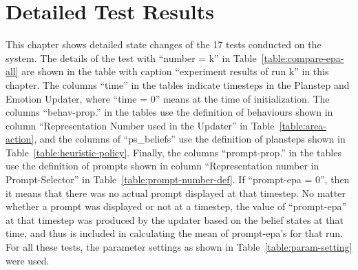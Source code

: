 
\chapter{Detailed Test Results}

This chapter shows detailed state changes of the 17 tests conducted on the system. The details of the test with ``number = k'' in Table~\ref{table:compare-epa-all} are shown in the table with caption ``experiment results of run k'' in this chapter. The columns ``time'' in the tables indicate timesteps in the Planstep and Emotion Updater, where ``time = 0'' means at the time of initialization. The columns ``behav-prop.'' in the tables use the definition of behaviours shown in column ``Representation Number used in the Updater'' in Table~\ref{table:area-action}, and the columns of ``ps\_beliefs'' use the definition of plansteps shown in Table~\ref{table:heuristic-policy}. Finally, the columns ``prompt-prop.'' in the tables use the definition of prompts shown in column ``Representation number in Prompt-Selector'' in Table~\ref{table:prompt-number-def}. If ``prompt-epa = 0'', then it means that there was no actual prompt displayed at that timestep. No matter whether a prompt was displayed or not at a timestep, the value of ``prompt-epa'' at that timestep was produced by the updater based on the belief states at that time, and thus is included in calculating the mean of prompt-epa's for that run. For all these tests, the parameter settings as shown in Table~\ref{table:param-setting} were used.




